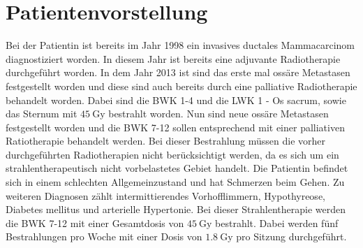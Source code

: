 \section{Patientenvorstellung}

Bei der Patientin ist bereits im Jahr 1998 ein invasives ductales Mammacarcinom
diagnostiziert worden. In diesem Jahr ist bereits eine adjuvante Radiotherapie
durchgeführt worden. In dem Jahr 2013 ist sind das erste mal ossäre Metastasen festgestellt worden
und diese sind auch bereits durch eine palliative Radiotherapie behandelt worden. Dabei sind
die BWK 1-4 und die LWK 1 - Os sacrum, sowie das Sternum mit $\SI{45}{\gray}$ bestrahlt worden.
Nun sind neue ossäre Metastasen festgestellt worden und die BWK 7-12 sollen entsprechend
mit einer palliativen Ratiotherapie behandelt werden. Bei dieser Bestrahlung müssen die
vorher durchgeführten Radiotherapien nicht berücksichtigt werden, da es sich um ein strahlentherapeutisch
nicht vorbelastetes Gebiet handelt.
Die Patientin befindet sich in einem schlechten Allgemeinzustand und hat Schmerzen beim Gehen.
Zu weiteren Diagnosen zählt intermittierendes Vorhofflimmern, Hypothyreose, Diabetes mellitus und
arterielle Hypertonie. Bei dieser Strahlentherapie werden die BWK 7-12 mit einer Gesamtdosis von
$\SI{45}{\gray}$ bestrahlt. Dabei werden fünf Bestrahlungen pro Woche mit einer Dosis von
$\SI{1.8}{\gray}$ pro Sitzung durchgeführt.
